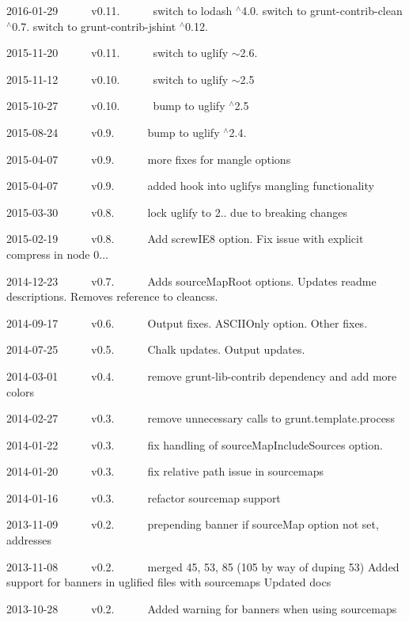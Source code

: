 \begin{DoxyItemize}
\item 2016-\/01-\/29   v0.11.   switch to lodash $^\wedge$4.0. switch to grunt-\/contrib-\/clean $^\wedge$0.7. switch to grunt-\/contrib-\/jshint $^\wedge$0.12.
\item 2015-\/11-\/20   v0.11.   switch to uglify $\sim$2.6.
\item 2015-\/11-\/12   v0.10.   switch to uglify $\sim$2.5
\item 2015-\/10-\/27   v0.10.   bump to uglify $^\wedge$2.5
\item 2015-\/08-\/24   v0.9.   bump to uglify $^\wedge$2.4.
\item 2015-\/04-\/07   v0.9.   more fixes for mangle options
\item 2015-\/04-\/07   v0.9.   added hook into uglify\textquotesingle{}s mangling functionality
\item 2015-\/03-\/30   v0.8.   lock uglify to 2.. due to breaking changes
\item 2015-\/02-\/19   v0.8.   \+Add {\ttfamily screw\+I\+E8} option. Fix issue with explicit {\ttfamily compress} in node 0...
\item 2014-\/12-\/23   v0.7.   \+Adds source\+Map\+Root options. Updates readme descriptions. Removes reference to cleancss.
\item 2014-\/09-\/17   v0.6.   \+Output fixes. A\+S\+C\+I\+I\+Only option. Other fixes.
\item 2014-\/07-\/25   v0.5.   \+Chalk updates. Output updates.
\item 2014-\/03-\/01   v0.4.   remove grunt-\/lib-\/contrib dependency and add more colors
\item 2014-\/02-\/27   v0.3.   remove unnecessary calls to {\ttfamily grunt.\+template.\+process}
\item 2014-\/01-\/22   v0.3.   fix handling of {\ttfamily source\+Map\+Include\+Sources} option.
\item 2014-\/01-\/20   v0.3.   fix relative path issue in sourcemaps
\item 2014-\/01-\/16   v0.3.   refactor sourcemap support
\item 2013-\/11-\/09   v0.2.   prepending banner if source\+Map option not set, addresses
\item 2013-\/11-\/08   v0.2.   merged 45, 53, 85 (105 by way of duping 53) Added support for banners in uglified files with sourcemaps Updated docs
\item 2013-\/10-\/28   v0.2.   \+Added warning for banners when using sourcemaps

\end{DoxyItemize}
